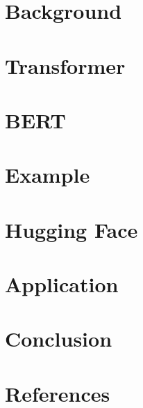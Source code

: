 \section[Back]{Background}


\section[Trs]{Transformer}


\section[BERT]{BERT}


\section[Ex]{Example}


\section[HF]{Hugging Face}


\section[Appln]{Application}


\section[Cncl]{Conclusion}


\section[Refs]{References}
